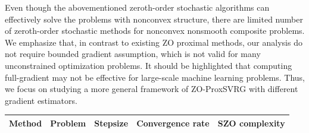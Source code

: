 \documentclass{article}
\theoremstyle{definition}
\theoremstyle{remark}
\begin{document}
Even though the abovementioned zeroth-order stochastic algorithms can effectively solve the problems with nonconvex structure, there are limited number of zeroth-order stochastic methods for nonconvex nonsmooth composite problems. We emphasize that, in contrast to existing ZO proximal methods, our analysis do not require bounded gradient assumption, which is not valid for many unconstrained optimization problems. 
It should be highlighted that computing full-gradient may not be effective for large-scale machine learning problems. Thus, we focus on studying a more general framework of ZO-ProxSVRG with different gradient estimators.
\begin{table}\label{table-compare}
\begin{center}
\begin{tabular}{ |l|l|l|l|l| } 
 \hline
 Method & Problem & Stepsize& Convergence rate & SZO complexity\\ 
 \hline
  

\end{tabular}
\end{center}
\end{table}
\end{document}
